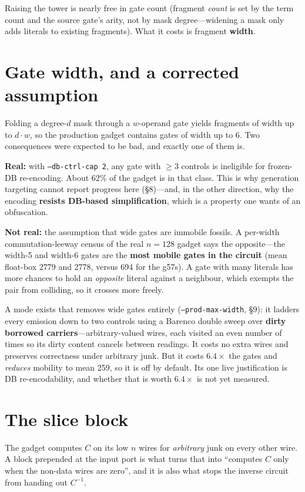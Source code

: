 \documentclass[11pt]{article}
\begin{document}
Raising the tower is nearly free in gate count (fragment \emph{count} is set by
the term count and the source gate's arity, not by mask degree---widening a mask
only adds literals to existing fragments). What it costs is fragment
\textbf{width}.

\section{Gate width, and a corrected assumption}

Folding a degree-$d$ mask through a $w$-operand gate yields fragments of width up
to $d\cdot w$, so the production gadget contains gates of width up to 6. Two
consequences were expected to be bad, and exactly one of them is.

\textbf{Real:} with \texttt{--db-ctrl-cap 2}, any gate with $\ge3$ controls is
ineligible for frozen-DB re-encoding. About 62\% of the gadget is in that class.
This is why generation targeting cannot report progress here (\S8)---and, in the
other direction, why the encoding \textbf{resists DB-based simplification},
which is a property one wants of an obfuscation.

\textbf{Not real:} the assumption that wide gates are immobile fossils. A
per-width commutation-leeway census of the real $n{=}128$ gadget says the
opposite---the width-5 and width-6 gates are the \textbf{most mobile gates in
the circuit} (mean float-box 2779 and 2778, versus 694 for the g57s). A gate
with many literals has more chances to hold an \emph{opposite} literal against a
neighbour, which exempts the pair from colliding, so it crosses more freely.

A mode exists that removes wide gates entirely (\texttt{--prod-max-width}, \S9):
it ladders every emission down to two controls using a Barenco double sweep over
\textbf{dirty borrowed carriers}---arbitrary-valued wires, each visited an even
number of times so its dirty content cancels between readings. It costs no extra
wires and preserves correctness under arbitrary junk. But it costs
$\mathbf{6.4\times}$ the gates and \emph{reduces} mobility to mean 259, so it is
off by default. Its one live justification is DB re-encodability, and whether
that is worth $6.4\times$ is not yet measured.

\section{The slice block}

The gadget computes $C$ on its low $n$ wires for \emph{arbitrary} junk on every
other wire. A block prepended at the input port is what turns that into
``computes $C$ only when the non-data wires are zero'', and it is also what stops
the inverse circuit from handing out $C^{-1}$.
\end{document}
